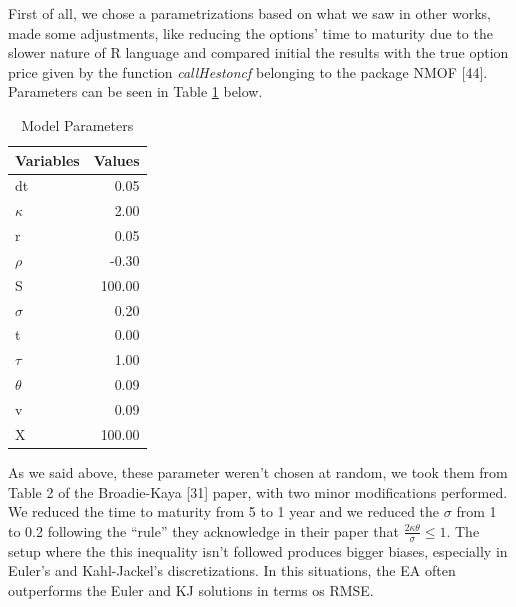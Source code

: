 \documentclass[12pt,oneside]{reedthesis}
\theoremstyle{definition}
\theoremstyle{definition}
\theoremstyle{remark}
\begin{document}
  First of all, we chose a parametrizations based on what we saw in other
  works, made some adjustments, like reducing the options' time to
  maturity due to the slower nature of R language and compared initial the
  results with the true option price given by the function
  \emph{callHestoncf} belonging to the package NMOF {[}44{]}. Parameters
  can be seen in Table \ref{param} below.
  \begin{table}[ht]
  \centering
  \begingroup\fontsize{9pt}{11pt}\selectfont
  \begin{tabular}{lr}
    \hline 
  Variables & Values \\ 
    \hline 
  dt & 0.05 \\ 
    $\kappa$ & 2.00 \\ 
    r & 0.05 \\ 
    $\rho$ & -0.30 \\ 
    S & 100.00 \\ 
    $\sigma$ & 0.20 \\ 
    t & 0.00 \\ 
    $\tau$ & 1.00 \\ 
    $\theta$ & 0.09 \\ 
    v & 0.09 \\ 
    X & 100.00 \\ 
     \hline 
  \end{tabular}
  \endgroup
  \caption{Model Parameters} 
  \label{param}
  \end{table}
  As we said above, these parameter weren't chosen at random, we took them
  from Table 2 of the Broadie-Kaya {[}31{]} paper, with two minor
  modifications performed. We reduced the time to maturity from 5 to 1
  year and we reduced the \(\sigma\) from 1 to 0.2 following the ``rule''
  they acknowledge in their paper that
  \(\frac{2 \kappa \theta}{\sigma} \leq 1\). The setup where the this
  inequality isn't followed produces bigger biases, especially in Euler's
  and Kahl-Jackel's discretizations. In this situations, the EA often
  outperforms the Euler and KJ solutions in terms os RMSE.
  
\end{document}
